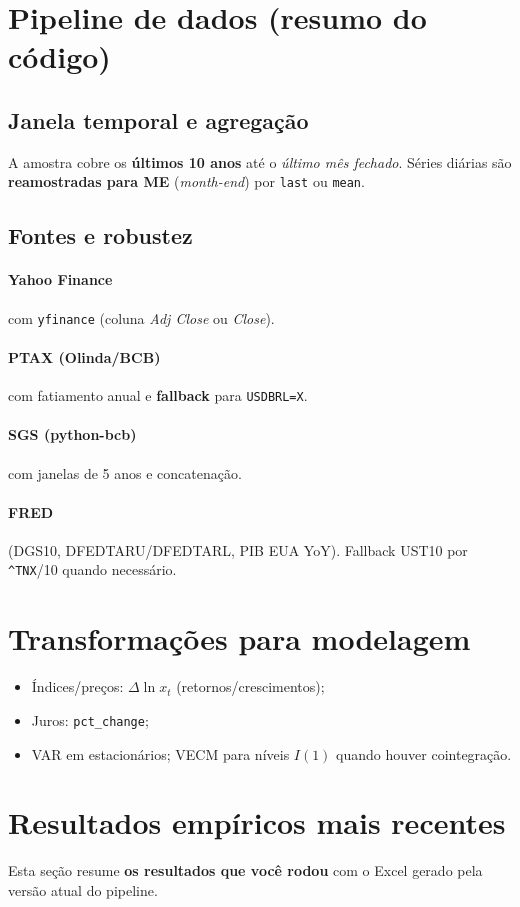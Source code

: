 \documentclass[11pt,a4paper]{article}
\begin{document}
\section{Pipeline de dados (resumo do código)}
\subsection{Janela temporal e agregação}
A amostra cobre os \textbf{últimos 10 anos} até o \emph{último mês fechado}. Séries diárias são \textbf{reamostradas para ME} (\emph{month-end}) por \texttt{last} ou \texttt{mean}.

\subsection{Fontes e robustez}
\paragraph{Yahoo Finance} com \texttt{yfinance} (coluna \emph{Adj Close} ou \emph{Close}).
\paragraph{PTAX (Olinda/BCB)} com fatiamento anual e \textbf{fallback} para \texttt{USDBRL=X}.
\paragraph{SGS (python-bcb)} com janelas de 5 anos e concatenação.
\paragraph{FRED} (DGS10, DFEDTARU/DFEDTARL, PIB EUA YoY). Fallback UST10 por \texttt{\^{}TNX}/10 quando necessário.

\section{Transformações para modelagem}
\begin{itemize}
  \item Índices/preços: \(\Delta \ln x_t\) (retornos/crescimentos);
  \item Juros: \texttt{pct\_change};
  \item VAR em estacionários; VECM para níveis \(I(1)\) quando houver cointegração.
\end{itemize}

\section{Resultados empíricos mais recentes}
Esta seção resume \textbf{os resultados que você rodou} com o Excel gerado pela versão atual do pipeline.
\end{document}
